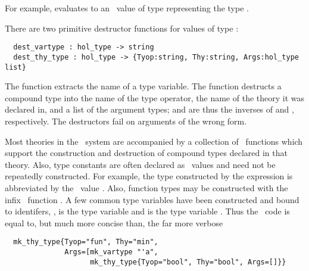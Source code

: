 For example, 
evaluates to an \ML\ value of type  representing the type
.

There are two primitive destructor  functions for values of type :
\begin{boxed}
\begin{verbatim}
  dest_vartype : hol_type -> string
  dest_thy_type : hol_type -> {Tyop:string, Thy:string, Args:hol_type list}
\end{verbatim}\end{boxed}

\noindent The function 
 extracts the name of a type variable.
The function   destructs a  compound type  into the  name
 of the type operator, the name of the theory it was declared in, and
 a  list  of  the  argument  types; 
   and  are  thus the  inverses of
  and , respectively.  The destructors fail
 on arguments of the wrong form.

Most theories in the \HOL\ system are accompanied by a collection of
\ML\ functions which support the construction and destruction of
compound types declared in that theory. Also, type constants are often
declared as \ML\ values and need not be repeatedly constructed. For
example, the type constructed by the expression
 is abbreviated
by the \ML\ value . Also, function types may be constructed
with the infix \ML\ function \ml{-->}. A few common type variables
have been constructed and bound to \ML{} identifers, \eg, 
is the type variable  and  is the type variable
.  Thus the \ML\ code  is equal to, but much more concise than,
the far more verbose
%
{\small
\begin{verbatim}
  mk_thy_type{Tyop="fun", Thy="min", 
              Args=[mk_vartype "'a", 
                    mk_thy_type{Tyop="bool", Thy="bool", Args=[]}}
\end{verbatim}
}

